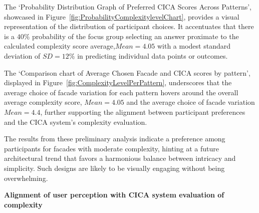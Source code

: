 
The `Probability Distribution Graph of Preferred CICA Scores Across Patterns', showcased in Figure~\ref{fig:ProbabilityComplexitylevelChart}, provides a visual representation of the distribution of participant choices.
It accentuates that there is a \(40\%\) probability of the focus group selecting an answer proximate to the calculated complexity score average,\(Mean = 4.05\) with a modest standard deviation of \(SD = 12\%\) in predicting individual data points or outcomes.


The `Comparison chart of Average Chosen Facade and CICA scores by pattern', displayed in Figure~\ref{fig:ComplexityLevelPerPattern}, underscores that the average choice of facade variation for each pattern hovers around the overall average complexity score, \(Mean = 4.05\) and the average choice of facade variation \(Mean = 4.4\), further supporting the alignment between participant preferences and the CICA system's complexity evaluation.


The results from these preliminary analysis indicate a preference among participants for facades with moderate complexity, hinting at a future architectural trend that favors a harmonious balance between intricacy and simplicity.
Such designs are likely to be visually engaging without being overwhelming.

\textbf{Alignment of user perception with CICA system evaluation of complexity}

